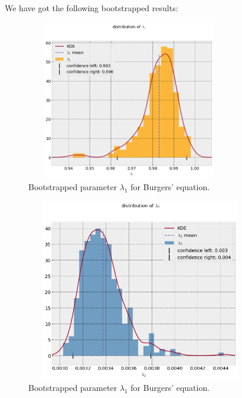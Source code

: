 \documentclass{beamer}
\begin{document}
\begin{frame}{}

We have got the following bootstrapped results:
\begin{figure}
\centering
\includegraphics[width = 9cm , height = 7cm]{images/bootstraped_l1.png}
\caption{Bootstrapped parameter $\lambda_1$ for Burgers' equation.}
\end{figure}

\end{frame}

\begin{frame}

\begin{figure}
    \centering
    \includegraphics[width = 10cm , height = 8cm]{images/bootstraped_l2.png}
    \caption{Bootstrapped parameter $\lambda_1$ for Burgers' equation.}
    \label{fig:bootstraped_l2}
\end{figure}
    
    
\end{frame}
\end{document}
